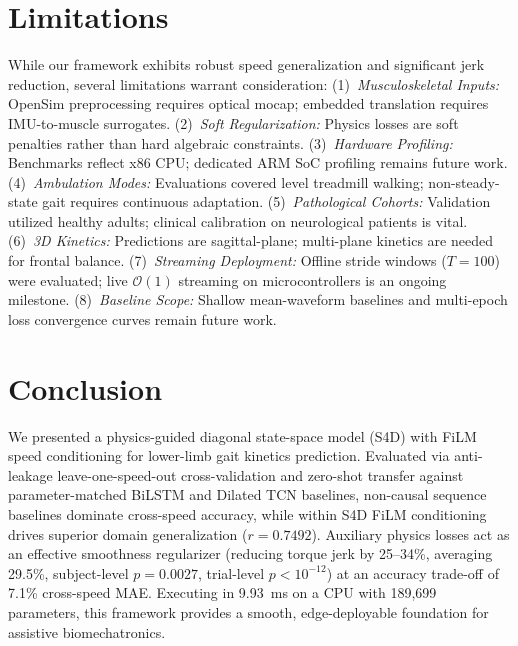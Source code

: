 \documentclass[journal]{IEEEtran}
\begin{document}
\section{Limitations}
\label{sec:limitations}
While our framework exhibits robust speed generalization and significant jerk reduction, several limitations warrant consideration: (1)~\emph{Musculoskeletal Inputs:} OpenSim preprocessing requires optical mocap; embedded translation requires IMU-to-muscle surrogates. (2)~\emph{Soft Regularization:} Physics losses are soft penalties rather than hard algebraic constraints. (3)~\emph{Hardware Profiling:} Benchmarks reflect x86 CPU; dedicated ARM SoC profiling remains future work. (4)~\emph{Ambulation Modes:} Evaluations covered level treadmill walking; non-steady-state gait requires continuous adaptation. (5)~\emph{Pathological Cohorts:} Validation utilized healthy adults; clinical calibration on neurological patients is vital. (6)~\emph{3D Kinetics:} Predictions are sagittal-plane; multi-plane kinetics are needed for frontal balance. (7)~\emph{Streaming Deployment:} Offline stride windows ($T=100$) were evaluated; live $\mathcal{O}(1)$ streaming on microcontrollers is an ongoing milestone. (8)~\emph{Baseline Scope:} Shallow mean-waveform baselines and multi-epoch loss convergence curves remain future work.

\section{Conclusion}
We presented a physics-guided diagonal state-space model (S4D) with FiLM speed conditioning for lower-limb gait kinetics prediction. Evaluated via anti-leakage leave-one-speed-out cross-validation and zero-shot transfer against parameter-matched BiLSTM and Dilated TCN baselines, non-causal sequence baselines dominate cross-speed accuracy, while within S4D FiLM conditioning drives superior domain generalization ($r = 0.7492$). Auxiliary physics losses act as an effective smoothness regularizer (reducing torque jerk by 25--34\%, averaging 29.5\%, subject-level $p = 0.0027$, trial-level $p < 10^{-12}$) at an accuracy trade-off of 7.1\% cross-speed MAE. Executing in 9.93~ms on a CPU with 189,699 parameters, this framework provides a smooth, edge-deployable foundation for assistive biomechatronics.

\def\IEEEbibitemsep{-1.0pt plus 0.2pt minus 0.1pt}
\vspace{-8pt}
\balance


\end{document}
